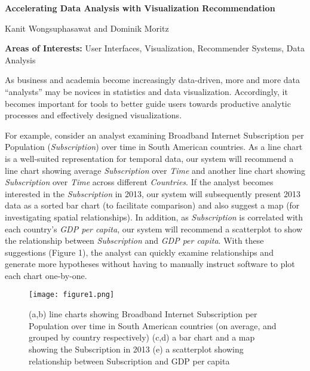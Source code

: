 

\newcommand{\abA}{4.25in}
\newcommand{\abO}{2.00in}
\newcommand{\abT}{2.75in}

\vspace{.10in}
\centerline{\Large \bf Accelerating Data Analysis with Visualization Recommendation}
\vspace{.10in}
\centerline{Kanit Wongsuphasawat and Dominik Moritz}
\vspace{-.1in}
\begin{center}
	{\bf Areas of Interests:} User Interfaces, Visualization, Recommender Systems, Data Analysis
\end{center}

As business and academia become increasingly data-driven,
more and more data “analysts” may be novices in statistics and data visualization.
Accordingly, it becomes important for tools to better guide users towards
productive analytic processes and effectively designed visualizations.

For example, consider an analyst examining Broadband Internet Subscription per Population (\textit{Subscription}) over time in South American countries. As a line chart is a well-suited representation for temporal data, our system will recommend a line chart showing average \textit{Subscription} over \textit{Time} and another line chart showing \textit{Subscription} over \textit{Time} across different \textit{Countries}.  If the analyst becomes interested in the \textit{Subscription} in 2013, our system will subsequently present 2013 data as a sorted bar chart (to facilitate comparison) and also suggest a map (for investigating spatial relationships).  In addition, as \textit{Subscription} is correlated with each country’s \textit{GDP per capita}, our system will recommend a scatterplot to show the relationship between \textit{Subscription} and \textit{GDP per capita}.  With these suggestions (Figure 1), the analyst can quickly examine relationships and generate more hypotheses without having to manually instruct software to plot each chart one-by-one.


\begin{figure}[!htbp]
\centering
\texttt{[image: figure1.png]}
\vspace{-0.1in}
\caption{(a,b) line charts showing Broadband Internet Subscription per Population over time in South American countries (on average, and grouped by country respectively) (c,d) a bar chart and a map showing the Subscription in 2013 (e) a scatterplot showing relationship between Subscription and GDP per capita}
\label{fig-examples}
\vspace{-0.15in}
\end{figure}
\vspace{0.1in}

